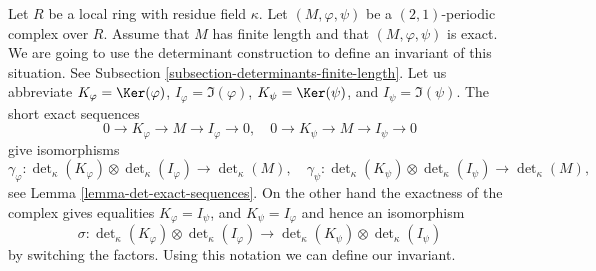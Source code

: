 \noindent
Let $R$ be a local ring with residue field $\kappa$.
Let $(M, \varphi, \psi)$ be a $(2, 1)$-periodic complex over $R$.
Assume that $M$ has finite length and that $(M, \varphi, \psi)$ is
exact. We are going to use the determinant construction to define
an invariant of this situation. See
Subsection \ref{subsection-determinants-finite-length}.
Let us abbreviate
$K_\varphi = \Ker(\varphi)$,
$I_\varphi = \Im(\varphi)$,
$K_\psi = \Ker(\psi)$, and
$I_\psi = \Im(\psi)$.
The short exact sequences
$$
0 \to K_\varphi \to M \to I_\varphi \to 0, \quad
0 \to K_\psi \to M \to I_\psi \to 0
$$
give isomorphisms
$$
\gamma_\varphi :
\det\nolimits_\kappa(K_\varphi)
\otimes
\det\nolimits_\kappa(I_\varphi)
\longrightarrow
\det\nolimits_\kappa(M), \quad
\gamma_\psi :
\det\nolimits_\kappa(K_\psi)
\otimes
\det\nolimits_\kappa(I_\psi)
\longrightarrow
\det\nolimits_\kappa(M),
$$
see Lemma \ref{lemma-det-exact-sequences}.
On the other hand the exactness of the complex gives equalities
$K_\varphi = I_\psi$, and $K_\psi = I_\varphi$
and hence an isomorphism
$$
\sigma :
\det\nolimits_\kappa(K_\varphi)
\otimes
\det\nolimits_\kappa(I_\varphi)
\longrightarrow
\det\nolimits_\kappa(K_\psi)
\otimes
\det\nolimits_\kappa(I_\psi)
$$
by switching the factors. Using this notation we can define our invariant.
